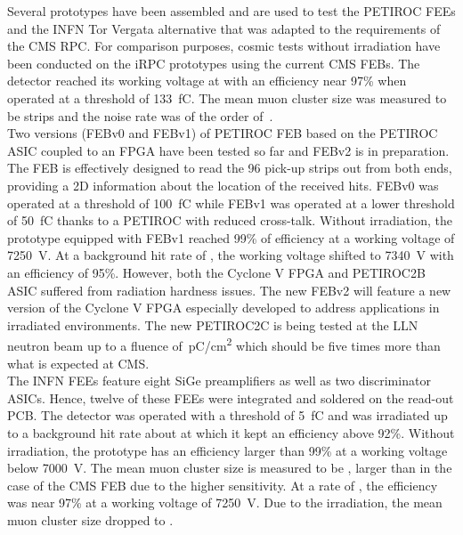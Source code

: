 	Several prototypes have been assembled and are used to test the PETIROC FEEs and the INFN Tor Vergata alternative that was adapted to the requirements of the CMS RPC. For comparison purposes, cosmic tests without irradiation have been conducted on the iRPC prototypes using the current CMS FEBs. The detector reached its working voltage at  with an efficiency near 97\% when operated at a threshold of \SI{133}{fC}. The mean muon cluster size was measured to be  strips and the noise rate was of the order of \,\sirate.\\
	Two versions (FEBv0 and FEBv1) of PETIROC FEB based on the PETIROC ASIC coupled to an FPGA have been tested so far and FEBv2 is in preparation. The FEB is effectively designed to read the 96 pick-up strips out from both ends, providing a 2D information about the location of the received hits. FEBv0 was operated at a threshold of \SI{100}{fC} while FEBv1 was operated at a lower threshold of \SI{50}{fC} thanks to a PETIROC with reduced cross-talk. Without irradiation, the prototype equipped with FEBv1 reached 99\% of efficiency at a working voltage of \SI{7250}{V}. At a background hit rate of , the working voltage shifted to \SI{7340}{V} with an efficiency of 95\%. However, both the Cyclone V FPGA and PETIROC2B ASIC suffered from radiation hardness issues. The new FEBv2 will feature a new version of the Cyclone V FPGA especially developed to address applications in irradiated environments. The new PETIROC2C is being tested at the \acf{LLN} neutron beam up to a fluence of \,\si{pC/cm^2} which should be five times more than what is expected at CMS.\\
	The INFN FEEs feature eight SiGe preamplifiers as well as two discriminator ASICs. Hence, twelve of these FEEs were integrated and soldered on the read-out PCB. The detector was operated with a threshold of \SI{5}{fC} and was irradiated up to a background hit rate about  at which it kept an efficiency above 92\%. Without irradiation, the prototype has an efficiency larger than 99\% at a working voltage below \SI{7000}{V}. The mean muon cluster size is measured to be , larger than in the case of the CMS FEB due to the higher sensitivity. At a rate of , the efficiency was near 97\% at a working voltage of \SI{7250}{V}. Due to the irradiation, the mean muon cluster size dropped to .\vspace{5mm}
	
